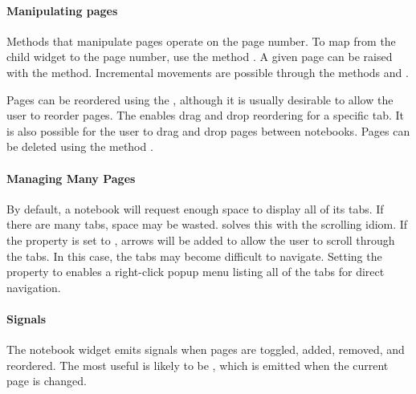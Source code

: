 \paragraph{Manipulating pages}

Methods that manipulate pages operate on the page number. To map from
the child widget to the page number, use the method
.   A given page can be raised with the
 method.  Incremental movements
are possible through the methods  and
.

Pages can be reordered using the ,
although it is usually desirable to allow the user to reorder
pages. The  enables drag and
drop reordering for a specific tab. It is also possible for the user
to drag and drop pages between notebooks. Pages can be deleted using
the method .

\paragraph{Managing Many Pages}

By default, a notebook will request enough space to display all of its
tabs. If there are many tabs, space may be wasted. 
solves this with the scrolling idiom. If the
property  is set to , arrows will be added
to allow the user to scroll through the tabs. In this case, the tabs
may become difficult to navigate. Setting the 
property to  enables a right-click popup menu listing all
of the tabs for direct navigation.

\paragraph{Signals}

The notebook widget emits signals when pages are toggled, added,
removed, and reordered. The most useful is likely to be
, which is emitted when the current page is
changed.

